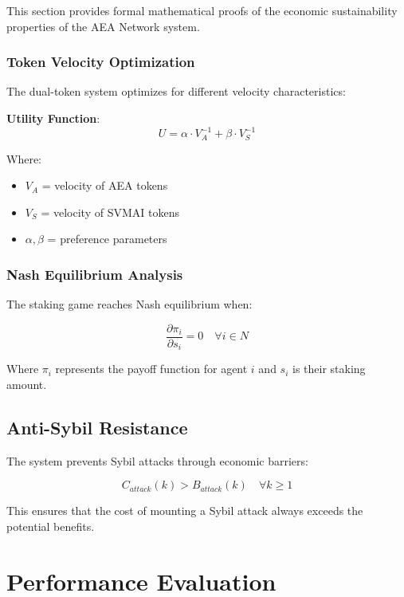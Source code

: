 \documentclass[12pt,a4paper]{article}
\begin{document}
This section provides formal mathematical proofs of the economic sustainability properties of the AEA Network system.

\subsubsection{Token Velocity Optimization}

The dual-token system optimizes for different velocity characteristics:

\textbf{Utility Function}:
\begin{equation}
U = \alpha \cdot V_A^{-1} + \beta \cdot V_S^{-1}
\end{equation}

Where:
\begin{itemize}
\item $V_A$ = velocity of AEA tokens
\item $V_S$ = velocity of SVMAI tokens
\item $\alpha, \beta$ = preference parameters
\end{itemize}

\subsubsection{Nash Equilibrium Analysis}

The staking game reaches Nash equilibrium when:

\begin{equation}
\frac{\partial \pi_i}{\partial s_i} = 0 \quad \forall i \in N
\end{equation}

Where $\pi_i$ represents the payoff function for agent $i$ and $s_i$ is their staking amount.

\subsection{Anti-Sybil Resistance}

The system prevents Sybil attacks through economic barriers:

\begin{equation}
C_{attack}(k) > B_{attack}(k) \quad \forall k \geq 1
\end{equation}

This ensures that the cost of mounting a Sybil attack always exceeds the potential benefits.

\section{Performance Evaluation}
\end{document}
